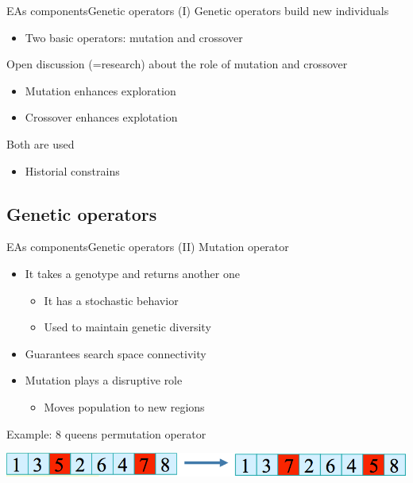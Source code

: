 \documentclass[10pt,compress]{beamer} %
\begin{document}
\begin{frame}{EAs components}{Genetic operators (I)} 
	Genetic operators build new individuals
	\begin{itemize}
		\item Two basic operators: \alert{mutation} and \alert{crossover}
	\end{itemize}
	
	Open discussion (=research) about the role of mutation and crossover
	\begin{itemize}
		\item Mutation enhances exploration
		\item Crossover enhances explotation
	\end{itemize}

	Both are used
	\begin{itemize}
		\item Historial constrains
	\end{itemize}
\end{frame}

\subsection{Genetic operators}

\begin{frame}{EAs components}{Genetic operators (II)} 
	Mutation operator
	\begin{itemize}
		\item It takes a genotype and returns another one
		\begin{itemize}
			\item It has a stochastic behavior
			\item Used to maintain genetic diversity
		\end{itemize}
		\item Guarantees search space connectivity 
		\item Mutation plays a disruptive role
		\begin{itemize}
			\item Moves population to new regions
		\end{itemize}
	\end{itemize}
	
	Example: 8 queens permutation operator
	\begin{center}
		\includegraphics[width=0.7\linewidth]{figs/permutacion.png}
	\end{center}
\end{frame}
\end{document}
